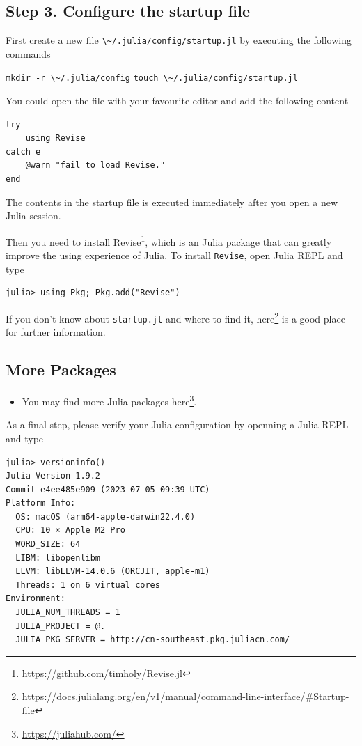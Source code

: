 \documentclass[
  notoc %
]{tufte-book}
\DeclareRobustCommand{\href}[2]{#2\footnote{\url{#1}}}
\providecommand{\tightlist}{%
  \setlength{\itemsep}{0pt}\setlength{\parskip}{0pt}
}
\newcommand{\passthrough}[1]{#1}
\begin{document}
\hypertarget{step-3.-configure-the-startup-file}{%
\subsection{Step 3. Configure the startup
file}\label{step-3.-configure-the-startup-file}}

First create a new file
\passthrough{\lstinline!\~/.julia/config/startup.jl!} by executing the
following commands

\passthrough{\lstinline!mkdir -r \~/.julia/config!}
\passthrough{\lstinline!touch \~/.julia/config/startup.jl!}

You could open the file with your favourite editor and add the following
content

\begin{lstlisting}
try
    using Revise
catch e
    @warn "fail to load Revise."
end
\end{lstlisting}

The contents in the startup file is executed immediately after you open
a new Julia session.

Then you need to install
\href{https://github.com/timholy/Revise.jl}{Revise}, which is an Julia
package that can greatly improve the using experience of Julia. To
install \passthrough{\lstinline!Revise!}, open Julia REPL and type

\begin{lstlisting}
julia> using Pkg; Pkg.add("Revise")
\end{lstlisting}

If you don't know about \passthrough{\lstinline!startup.jl!} and where
to find it,
\href{https://docs.julialang.org/en/v1/manual/command-line-interface/\#Startup-file}{here}
is a good place for further information.

\hypertarget{more-packages}{%
\subsection{More Packages}\label{more-packages}}

\begin{itemize}
\tightlist
\item
  You may find more Julia packages \href{https://juliahub.com/}{here}.
\end{itemize}

As a final step, please verify your Julia configuration by openning a
Julia REPL and type

\begin{lstlisting}
julia> versioninfo()
Julia Version 1.9.2
Commit e4ee485e909 (2023-07-05 09:39 UTC)
Platform Info:
  OS: macOS (arm64-apple-darwin22.4.0)
  CPU: 10 × Apple M2 Pro
  WORD_SIZE: 64
  LIBM: libopenlibm
  LLVM: libLLVM-14.0.6 (ORCJIT, apple-m1)
  Threads: 1 on 6 virtual cores
Environment:
  JULIA_NUM_THREADS = 1
  JULIA_PROJECT = @.
  JULIA_PKG_SERVER = http://cn-southeast.pkg.juliacn.com/ 
\end{lstlisting}
\end{document}
